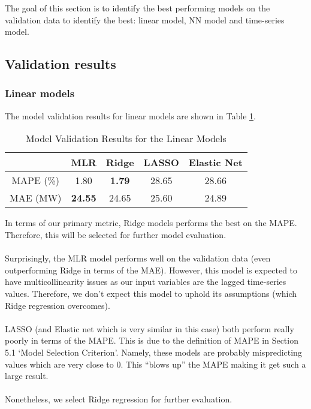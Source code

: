 \documentclass[11pt]{article}
\begin{document}
The goal of this section is to identify the best performing models on the validation data to identify the best: linear model, NN model and time-series model. 

\subsection{Validation results}

\subsubsection{Linear models}

The model validation results for linear models are shown in Table \ref{table:model_validation_linear}.

\begin{table}[H]
\centering
\caption{Model Validation Results for the Linear Models}
\label{table:model_validation_linear}
\begin{tabular}{@{}ccccc@{}}
\toprule
 & \textbf{MLR} & \textbf{Ridge} & \textbf{LASSO} & \textbf{Elastic Net} \\ \midrule
MAPE (\%) & 1.80 & \textbf{1.79} & 28.65 & 28.66 \\
MAE (MW) & \textbf{24.55} & 24.65 & 25.60 & 24.89 \\ \bottomrule
\end{tabular}
\end{table}

\noindent In terms of our primary metric, Ridge models performs the best on the MAPE. Therefore, this will be selected for further model evaluation.
\\
\\
Surprisingly, the MLR model performs well on the validation data (even outperforming Ridge in terms of the MAE). However, this model is expected to have multicollinearity issues as our input variables are the lagged time-series values. Therefore, we don’t expect this model to uphold its assumptions (which Ridge regression overcomes). 
\\
\\
LASSO (and Elastic net which is very similar in this case) both perform really poorly in terms of the MAPE. This is due to the definition of MAPE in Section 5.1 ‘Model Selection Criterion’. Namely, these models are probably mispredicting values which are very close to 0. This “blows up” the MAPE making it get such a large result.
\\
\\
Nonetheless, we select Ridge regression for further evaluation.
\end{document}
